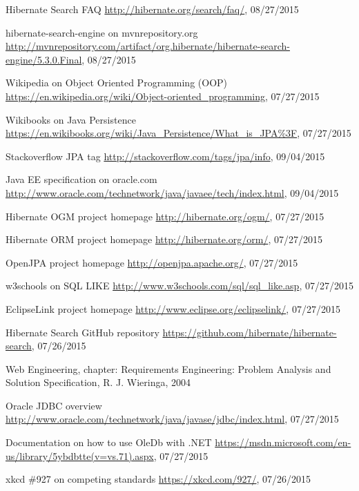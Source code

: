 \begin{thebibliography}{99}
	Hibernate Search FAQ
	\url{http://hibernate.org/search/faq/}, 08/27/2015
	
	hibernate-search-engine on mvnrepository.org
	\url{http://mvnrepository.com/artifact/org.hibernate/hibernate-search-engine/5.3.0.Final}, 08/27/2015
	
	Wikipedia on Object Oriented Programming (OOP)
	\url{https://en.wikipedia.org/wiki/Object-oriented_programming}, 07/27/2015
	
	Wikibooks on Java Persistence
	\url{https://en.wikibooks.org/wiki/Java_Persistence/What_is_JPA\%3F}, 07/27/2015
	
	Stackoverflow JPA tag
	\url{http://stackoverflow.com/tags/jpa/info}, 09/04/2015
	
	Java EE specification on oracle.com
	\url{http://www.oracle.com/technetwork/java/javaee/tech/index.html}, 09/04/2015
	
	Hibernate OGM project homepage
	\url{http://hibernate.org/ogm/}, 07/27/2015
	
	Hibernate ORM project homepage
	\url{http://hibernate.org/orm/}, 07/27/2015
	
	OpenJPA project homepage
	\url{http://openjpa.apache.org/}, 07/27/2015
	
	w3schools on SQL LIKE
	\url{http://www.w3schools.com/sql/sql_like.asp}, 07/27/2015
	
	EclipseLink project homepage
	\url{http://www.eclipse.org/eclipselink/}, 07/27/2015
	
	Hibernate Search GitHub repository
	\url{https://github.com/hibernate/hibernate-search}, 07/26/2015
	
	Web Engineering, chapter: Requirements Engineering: Problem Analysis and Solution Specification, R. J. Wieringa, 2004
	
	Oracle JDBC overview
	\url{http://www.oracle.com/technetwork/java/javase/jdbc/index.html}, 07/27/2015
	
	Documentation on how to use OleDb with .NET
	\url{https://msdn.microsoft.com/en-us/library/5ybdbtte(v=vs.71).aspx}, 07/27/2015
	
	xkcd \#927 on competing standards
	\url{https://xkcd.com/927/}, 07/26/2015
	

\end{thebibliography}

